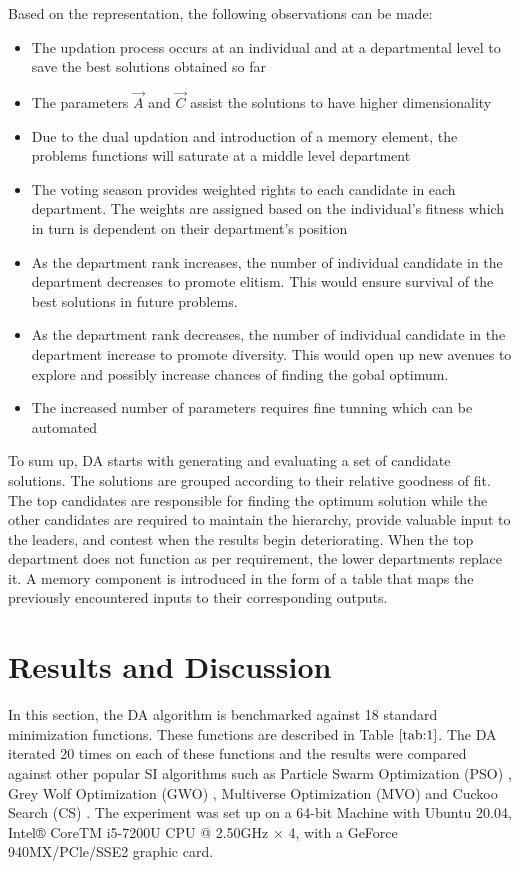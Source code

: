 \documentclass[conference]{IEEEtran}
\begin{document}
Based on the representation, the following observations can be made:
\begin{itemize}
\item The updation process occurs at an individual and at a departmental level to save the best solutions obtained so far
\item The parameters $\vec{A}$ and $\vec{C}$ assist the solutions to have higher dimensionality
\item Due to the dual updation and introduction of a memory element, the problems functions will saturate at a middle level department
\item The voting season provides weighted rights to each candidate in each department. The weights are assigned based on the individual's fitness which in turn is dependent on their department's position 
\item As the department rank increases, the number of individual candidate in the department decreases to promote elitism. This would ensure survival of the best solutions in future problems. 
\item As the department rank decreases, the number of individual candidate in the department increase to promote diversity. This would open up new avenues to explore and possibly increase chances of finding the gobal optimum.  
\item The increased number of parameters requires fine tunning which can be automated
\end{itemize}

To sum up, DA starts with generating and evaluating a set of candidate solutions. The solutions are grouped according to their relative goodness of fit. The top candidates are responsible for finding the optimum solution while the other candidates are required to maintain the hierarchy, provide valuable input to the leaders, and contest when the results begin deteriorating. When the top department does not function as per requirement, the lower departments replace it. A memory component is introduced in the form of a table that maps the previously encountered inputs to their corresponding outputs. 



\section{Results and Discussion}

In this section, the DA algorithm is benchmarked against 18 standard minimization functions. These functions are described in Table $\ref{tab:1}$. The DA  iterated 20 times on each of these functions and the results were compared against other popular SI algorithms such as Particle Swarm Optimization (PSO) \cite{pso}, Grey Wolf Optimization (GWO) \cite{gwo}, Multiverse Optimization (MVO)\cite{mvo} and Cuckoo Search (CS) \cite{cs}. The experiment was set up on a 64-bit Machine with Ubuntu 20.04, Intel® CoreTM i5-7200U CPU @ 2.50GHz × 4, with a GeForce 940MX/PCle/SSE2 graphic card.
\end{document}
